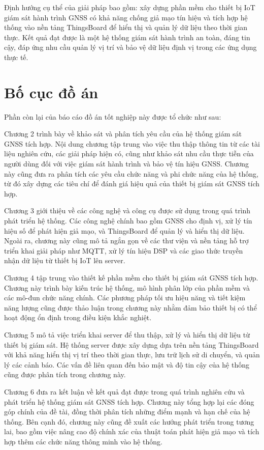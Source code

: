 \documentclass[../DoAn.tex]{subfiles}
\begin{document}
Định hướng cụ thể của giải pháp bao gồm: xây dựng phần mềm cho thiết bị IoT giám sát hành trình GNSS có khả năng chống giả mạo tín hiệu và tích hợp hệ thống vào nền tảng ThingsBoard để hiển thị và quản lý dữ liệu theo thời gian thực. Kết quả đạt được là một hệ thống giám sát hành trình an toàn, đáng tin cậy, đáp ứng nhu cầu quản lý vị trí và bảo vệ dữ liệu định vị trong các ứng dụng thực tế.
\section{Bố cục đồ án}
\label{section:1.4}
Phần còn lại của báo cáo đồ án tốt nghiệp này được tổ chức như sau:

Chương 2 trình bày về khảo sát và phân tích yêu cầu của hệ thống giám sát GNSS tích hợp. Nội dung chương tập trung vào việc thu thập thông tin từ các tài liệu nghiên cứu, các giải pháp hiện có, cũng như khảo sát nhu cầu thực tiễn của người dùng đối với việc giám sát hành trình và bảo vệ tín hiệu GNSS. Chương này cũng đưa ra phân tích các yêu cầu chức năng và phi chức năng của hệ thống, từ đó xây dựng các tiêu chí để đánh giá hiệu quả của thiết bị giám sát GNSS tích hợp.

Chương 3 giới thiệu về các công nghệ và công cụ được sử dụng trong quá trình phát triển hệ thống. Các công nghệ chính bao gồm GNSS cho định vị, xử lý tín hiệu số để phát hiện giả mạo, và ThingsBoard để quản lý và hiển thị dữ liệu. Ngoài ra, chương này cũng mô tả ngắn gọn về các thư viện và nền tảng hỗ trợ triển khai giải pháp như MQTT, xử lý tín hiệu DSP và các giao thức truyền nhận dữ liệu từ thiết bị IoT lên server.

Chương 4 tập trung vào thiết kế phần mềm cho thiết bị giám sát GNSS tích hợp. Chương này trình bày kiến trúc hệ thống, mô hình phân lớp của phần mềm và các mô-đun chức năng chính. Các phương pháp tối ưu hiệu năng và tiết kiệm năng lượng cũng được thảo luận trong chương này nhằm đảm bảo thiết bị có thể hoạt động ổn định trong điều kiện khắc nghiệt.

Chương 5 mô tả việc triển khai server để thu thập, xử lý và hiển thị dữ liệu từ thiết bị giám sát. Hệ thống server được xây dựng dựa trên nền tảng ThingsBoard với khả năng hiển thị vị trí theo thời gian thực, lưu trữ lịch sử di chuyển, và quản lý các cảnh báo. Các vấn đề liên quan đến bảo mật và độ tin cậy của hệ thống cũng được phân tích trong chương này.

Chương 6 đưa ra kết luận về kết quả đạt được trong quá trình nghiên cứu và phát triển hệ thống giám sát GNSS tích hợp. Chương này tổng hợp lại các đóng góp chính của đề tài, đồng thời phân tích những điểm mạnh và hạn chế của hệ thống. Bên cạnh đó, chương này cũng đề xuất các hướng phát triển trong tương lai, bao gồm việc nâng cao độ chính xác của thuật toán phát hiện giả mạo và tích hợp thêm các chức năng thông minh vào hệ thống.
\end{document}
